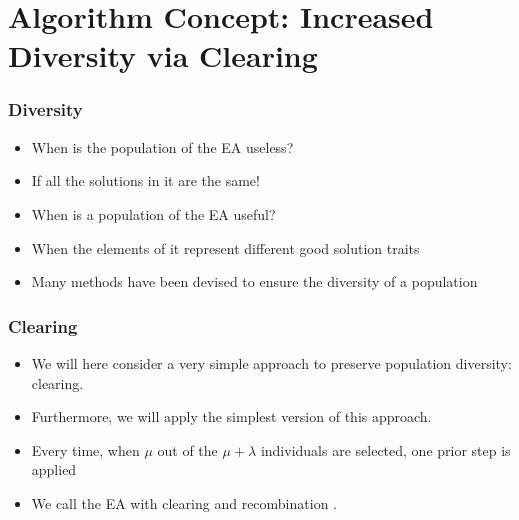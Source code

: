 \documentclass[mathserif]{beamer}%
\begin{document}
\section{Algorithm Concept: Increased Diversity via Clearing}%
%
\begin{frame}%
\frametitle{Diversity}%
\begin{itemize}%
\item When is the population of the EA useless?%
\item<2-> If all the solutions in it are the same!%
\item<3-> When is a population of the EA useful?%
\item<4-> When the elements of it represent different good solution traits%
\item<6-> Many methods have been devised to ensure the diversity of a population%
\end{itemize}%
\end{frame}%
%
%
\begin{frame}%
\frametitle{Clearing}%
\begin{itemize}%
\item We will here consider a very simple approach to preserve population diversity: \alert{clearing}\cite{S2012NIEA,FHN2007RAOSDM}.%
\item<2-> Furthermore, we will apply the simplest version of this approach.%
\item<3-> Every time, when $\mu$ out of the $\mu+\lambda$ individuals are selected, one prior step is applied%
\item<5-> We call the EA with clearing and recombination .%
\end{itemize}%
\end{frame}%
%
\end{document}
